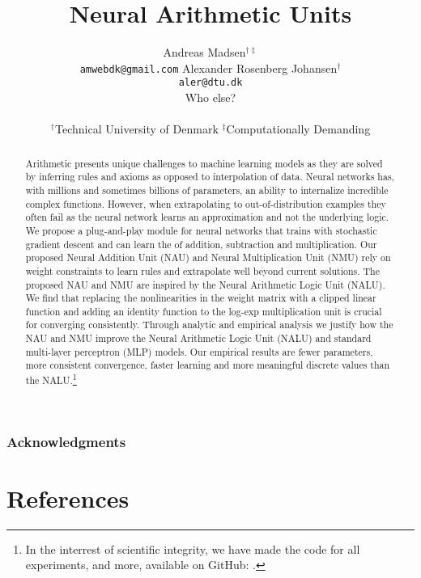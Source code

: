\documentclass{article}
\title{Neural Arithmetic Units}
\author{%
  Andreas Madsen$^{\dag\ddag}$ \\
  \texttt{amwebdk@gmail.com}
  \AND
  Alexander Rosenberg Johansen$^{\dag}$ \\
  \texttt{aler@dtu.dk} \\
  \AND
  Who else? \\
  \\
$^\dag$Technical University of Denmark \quad
$^\ddag$Computationally Demanding
}
\begin{document}
\StopCensoring %

\maketitle

\begin{abstract}
Arithmetic presents unique challenges to machine learning models as they are solved by inferring rules and axioms as opposed to interpolation of data.
Neural networks has, with millions and sometimes billions of parameters, an ability to internalize incredible complex functions.
However, when extrapolating to out-of-distribution examples they often fail as the neural network learns an approximation and not the underlying logic.
We propose a plug-and-play module for neural networks that trains with stochastic gradient descent and can learn the of addition, subtraction and multiplication.
Our proposed Neural Addition Unit (NAU) and Neural Multiplication Unit (NMU) rely on weight constraints to learn rules and extrapolate well beyond current solutions.
The proposed NAU and NMU are inspired by the Neural Arithmetic Logic Unit (NALU).
We find that replacing the nonlinearities in the weight matrix with a clipped linear function and adding an identity function to the log-exp multiplication unit is crucial for converging consistently.
Through analytic and empirical analysis we justify how the NAU and NMU improve the Neural Arithmetic Logic Unit (NALU) and standard multi-layer perceptron (MLP) models.
Our empirical results are fewer parameters, more consistent convergence, faster learning and more meaningful discrete values than the NALU.\footnote{In the interrest of scientific integrity, we have made the code for all experiments, and more, available on GitHub: . }
\end{abstract}





\subsubsection*{Acknowledgments}


\section*{References}


\end{document}
